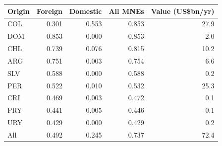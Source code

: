 \begin{tabular}{lrrrr}
\toprule
Origin & Foreign & Domestic & All MNEs & Value (US\$bn/yr) \\
\midrule
COL & 0.301 & 0.553 & 0.853 & 27.9 \\
DOM & 0.853 & 0.000 & 0.853 & 2.0 \\
CHL & 0.739 & 0.076 & 0.815 & 10.2 \\
ARG & 0.751 & 0.003 & 0.754 & 6.6 \\
SLV & 0.588 & 0.000 & 0.588 & 0.2 \\
PER & 0.522 & 0.010 & 0.532 & 25.3 \\
CRI & 0.469 & 0.003 & 0.472 & 0.1 \\
PRY & 0.441 & 0.005 & 0.446 & 0.1 \\
URY & 0.429 & 0.000 & 0.429 & 0.2 \\
\midrule
All & 0.492 & 0.245 & 0.737 & 72.4 \\
\bottomrule
\end{tabular}
